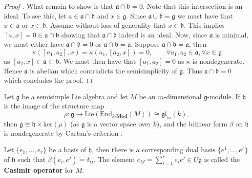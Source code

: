 \begin{proof}[Proof \cite{weibel1994homological}]
  What remain to show is that $ \mathfrak{a} \cap \mathfrak{b} = 0 $. Note that this intersection is an ideal. To see this, let $ a \in \mathfrak{a} \cap \mathfrak{b} $ and $ x \in \mathfrak{g} $. Since $ \mathfrak{a} \cup \mathfrak{b} = \mathfrak{g} $ we must have that $ x \in \mathfrak{a} $ or $ x \in \mathfrak{b} $. Assume without loss of generality that $ x \in \mathfrak{b} $. This implies $ [a, x] = 0 \in \mathfrak{a} \cap \mathfrak{b} $ showing that $ \mathfrak{a} \cap \mathfrak{b} $ indeed is an ideal. Now, since $ \mathfrak{a} $ is minimal, we must either have $ \mathfrak{a} \cap \mathfrak{b} = 0 $ or $ \mathfrak{a} \cap \mathfrak{b} = \mathfrak{a} $. Suppose $ \mathfrak{a} \cap \mathfrak{b} = \mathfrak{a} $, then
  \begin{equation}
    \kappa([a_1, a_2], x) = \kappa(a_1, [a_2, x]) = 0,\quad\quad \forall a_1, a_2 \in \mathfrak{a}, \forall x \in \mathfrak{g}
  \end{equation}
  as $ [a_2, x] \in \mathfrak{a}\subset \mathfrak{b} $. We must then have that $ [a_1, a_2] = 0 $ as $ \kappa $ is nondegenerate. Hence $ \mathfrak{a} $ is abelian which contradicts the semisimplicity of $ \mathfrak{g} $. Thus $ \mathfrak{a} \cap \mathfrak{b} = 0 $ which concludes the proof.
\end{proof}

Let $ \mathfrak{g} $ be a semisimple Lie algebra and let $ M $ be an $ m $-dimensional $ \mathfrak{g} $-module. If $ \mathfrak{h} $ is the image of the structure map
\begin{equation}
  \rho: \mathfrak{g} \to \text{Lie}(\text{End}_{k\text{-}\mathbf{Mod}}(M)) \cong \mathfrak{gl}_m(k),
\end{equation}
then $ \mathfrak{g} \cong \mathfrak{h} \times \text{ker}(\rho) $ (as $ \mathfrak{g} $ is a vector space over $ k $), and the bilinear form $ \beta $ on $ \mathfrak{h} $ is nondegenerate by Cartan's criterion \cite[Section 7.8]{weibel1994homological}.
\begin{definition}
  Let $ \{e_1, \ldots, e_r\} $ be a basis of $ \mathfrak{h} $, then there is a corresponding dual basis $ \{e^1, \ldots, e^r\}  $ of $ \mathfrak{h} $ such that $ \beta(e_i, e^j) = \delta_{ij} $. The element $ c_M = \sum_{i = 1}^{r} e_ie^j \in U\mathfrak{g} $ is called the \textbf{Casimir operator} for $ M $.
\end{definition}

